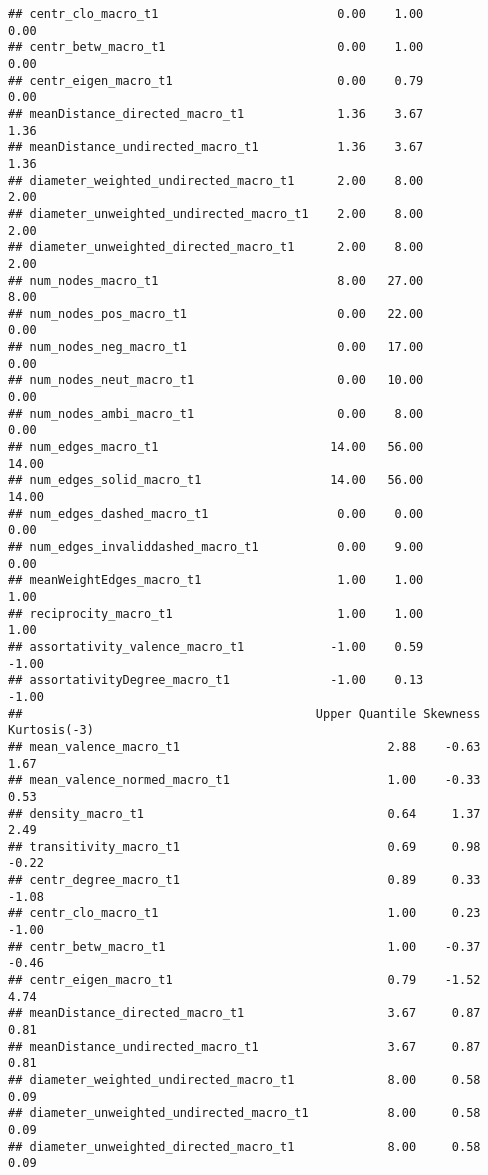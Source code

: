 \documentclass[
]{article}
\begin{document}
\begin{verbatim}
## centr_clo_macro_t1                         0.00    1.00           0.00
## centr_betw_macro_t1                        0.00    1.00           0.00
## centr_eigen_macro_t1                       0.00    0.79           0.00
## meanDistance_directed_macro_t1             1.36    3.67           1.36
## meanDistance_undirected_macro_t1           1.36    3.67           1.36
## diameter_weighted_undirected_macro_t1      2.00    8.00           2.00
## diameter_unweighted_undirected_macro_t1    2.00    8.00           2.00
## diameter_unweighted_directed_macro_t1      2.00    8.00           2.00
## num_nodes_macro_t1                         8.00   27.00           8.00
## num_nodes_pos_macro_t1                     0.00   22.00           0.00
## num_nodes_neg_macro_t1                     0.00   17.00           0.00
## num_nodes_neut_macro_t1                    0.00   10.00           0.00
## num_nodes_ambi_macro_t1                    0.00    8.00           0.00
## num_edges_macro_t1                        14.00   56.00          14.00
## num_edges_solid_macro_t1                  14.00   56.00          14.00
## num_edges_dashed_macro_t1                  0.00    0.00           0.00
## num_edges_invaliddashed_macro_t1           0.00    9.00           0.00
## meanWeightEdges_macro_t1                   1.00    1.00           1.00
## reciprocity_macro_t1                       1.00    1.00           1.00
## assortativity_valence_macro_t1            -1.00    0.59          -1.00
## assortativityDegree_macro_t1              -1.00    0.13          -1.00
##                                         Upper Quantile Skewness Kurtosis(-3)
## mean_valence_macro_t1                             2.88    -0.63         1.67
## mean_valence_normed_macro_t1                      1.00    -0.33         0.53
## density_macro_t1                                  0.64     1.37         2.49
## transitivity_macro_t1                             0.69     0.98        -0.22
## centr_degree_macro_t1                             0.89     0.33        -1.08
## centr_clo_macro_t1                                1.00     0.23        -1.00
## centr_betw_macro_t1                               1.00    -0.37        -0.46
## centr_eigen_macro_t1                              0.79    -1.52         4.74
## meanDistance_directed_macro_t1                    3.67     0.87         0.81
## meanDistance_undirected_macro_t1                  3.67     0.87         0.81
## diameter_weighted_undirected_macro_t1             8.00     0.58         0.09
## diameter_unweighted_undirected_macro_t1           8.00     0.58         0.09
## diameter_unweighted_directed_macro_t1             8.00     0.58         0.09

\end{verbatim}
\end{document}
